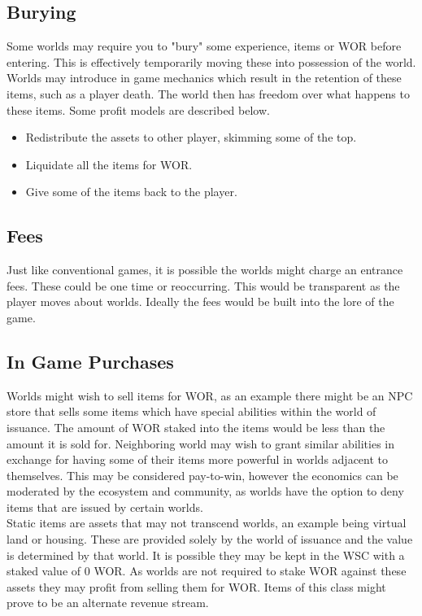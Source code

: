 \documentclass[runningheads,a4paper]{llncs}
\begin{document}
\subsection{Burying}
\label{Burying}
Some worlds may require you to "bury" some experience, items or WOR before entering. This is effectively temporarily moving these into possession of the world. Worlds may introduce in game mechanics which result in the retention of these items, such as a player death. The world then has freedom over what happens to these items. Some profit models are described below.

\begin{itemize}
\item{Redistribute the assets to other player, skimming some of the top.}
\item{Liquidate all the items for WOR.}
\item{Give some of the items back to the player.}
\end{itemize}

\subsection{Fees}
Just like conventional games, it is possible the worlds might charge an entrance fees. These could be one time or reoccurring. This would be transparent as the player moves about worlds. Ideally the fees would be built into the lore of the game.

\subsection{In Game Purchases}
Worlds might wish to sell items for WOR, as an example there might be an NPC store that sells some items which have special abilities within the world of issuance. The amount of WOR staked into the items would be less than the amount it is sold for. Neighboring world may wish to grant similar abilities in exchange for having some of their items more powerful in worlds adjacent to themselves. This may be considered pay-to-win, however the economics can be moderated by the ecosystem and community, as worlds have the option to deny items that are issued by certain worlds.\\

Static items are assets that may not transcend worlds, an example being virtual land or housing. These are provided solely by the world of issuance and the value is determined by that world. It is possible they may be kept in the WSC with a staked value of 0 WOR. As worlds are not required to stake WOR against these assets they may profit from selling them for WOR. Items of this class might prove to be an alternate revenue stream.
\end{document}
